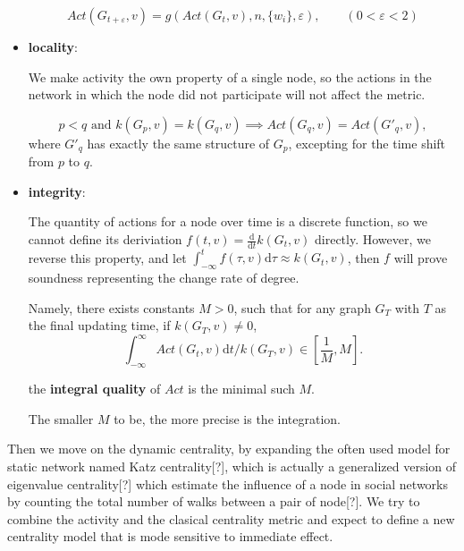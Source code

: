 \documentclass[12pt,abstract=true]{scrartcl}
\numberwithin{equation}{section}
\theoremstyle{definition}   \newtheorem{definition}{Definition}[section]
\theoremstyle{plain}        \newtheorem{theorem}{Theorem}[section]
\theoremstyle{plain}        \newtheorem{observation}{Observation}[section]
\theoremstyle{plain}        \newtheorem{fact}{Fact}[section]
\theoremstyle{plain}        \newtheorem{claim}{Claim}[section]
\theoremstyle{plain}        \newtheorem{lemma}[theorem]{Lemma}
\theoremstyle{plain}        \newtheorem{corollary}[theorem]{Corollary}
\theoremstyle{remark}       \newtheorem{example}{Example}[section]
\theoremstyle{remark}       \newtheorem{remark}{Remark}[section]
\begin{document}
\begin{itemize}
\begin{equation}
\mathit{Act}(G_{t+\varepsilon},v)=g(\mathit{Act}(G_t,v),n,\{w_i\},\varepsilon),
\qquad (0<\varepsilon<2)\label{eq-sym}
\end{equation}

\item \textbf{locality}:

We make activity the own property of a single node, so the actions in the
network in which the node did not participate will not affect the metric.

\begin{equation}
p<q\text{ and }k(G_p,v)=k(G_q,v)\implies \mathit{Act}(G_q,v)=\mathit{Act}(G'_q,v),\label{eq-loc}
\end{equation}
where $G'_q$ has exactly the same structure of $G_p$, excepting for the time
shift from $p$ to $q$.

\item \textbf{integrity}:

The quantity of actions for a node over time is a discrete function, so we
cannot define its deriviation $f(t,v)=\frac{\mathrm{d}}{\mathrm{d}t}k(G_t,v)$
directly. However, we reverse this property, and let $\int_{-\infty}^t
f(\tau,v)\mathrm{d}\tau\approx k(G_t,v)$, then $f$ will prove soundness
representing the change rate of degree.

Namely, there exists constants $M>0$, such that for any
graph $G_T$ with $T$ as the final updating time, if $k(G_T,v)\neq 0$,
\begin{equation}
\int_{-\infty}^{\infty} \mathit{Act}(G_t,v)\mathrm{d}t/k(G_T,v)\in\left[\frac{1}{M},M\right].
\label{eq-int}
\end{equation}

 the \textbf{integral quality} of $\mathit{Act}$ is the minimal such $M$.

The smaller $M$ to be, the more precise is the integration.

\end{itemize}

Then we move on the dynamic centrality, by expanding the often used model
for static network named Katz centrality[?], which is actually a generalized
version of eigenvalue centrality[?] which estimate the influence of a node in
social networks by counting the total number of walks between a pair of
node[?]. We try to combine the activity and the clasical centrality metric and
expect to define a new centrality model that is mode sensitive to immediate
effect.
\end{document}
